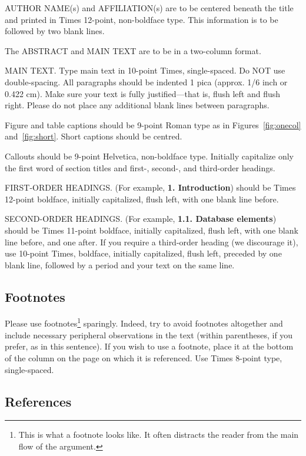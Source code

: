\documentclass[10pt,twocolumn,letterpaper]{article}
\begin{document}
AUTHOR NAME(s) and AFFILIATION(s) are to be centered beneath the title
and printed in Times 12-point, non-boldface type. This information is to
be followed by two blank lines.

The ABSTRACT and MAIN TEXT are to be in a two-column format.

MAIN TEXT. Type main text in 10-point Times, single-spaced. Do NOT use
double-spacing. All paragraphs should be indented 1 pica (approx. 1/6
inch or 0.422 cm). Make sure your text is fully justified---that is,
flush left and flush right. Please do not place any additional blank
lines between paragraphs.

Figure and table captions should be 9-point Roman type as in
Figures~\ref{fig:onecol} and~\ref{fig:short}.  Short captions should be centred.

\noindent Callouts should be 9-point Helvetica, non-boldface type.
Initially capitalize only the first word of section titles and first-,
second-, and third-order headings.

FIRST-ORDER HEADINGS. (For example, {\large \bf 1. Introduction})
should be Times 12-point boldface, initially capitalized, flush left,
with one blank line before.

SECOND-ORDER HEADINGS. (For example, { \bf 1.1. Database elements})
should be Times 11-point boldface, initially capitalized, flush left,
with one blank line before, and one after. If you require a third-order
heading (we discourage it), use 10-point Times, boldface, initially
capitalized, flush left, preceded by one blank line, followed by a period
and your text on the same line.

\subsection{Footnotes}

Please use footnotes\footnote {This is what a footnote looks like.  It
often distracts the reader from the main flow of the argument.} sparingly.
Indeed, try to avoid footnotes altogether and include necessary peripheral
observations in
the text (within parentheses, if you prefer, as in this sentence).  If you
wish to use a footnote, place it at the bottom of the column on the page on
which it is referenced. Use Times 8-point type, single-spaced.


\subsection{References}
\end{document}
